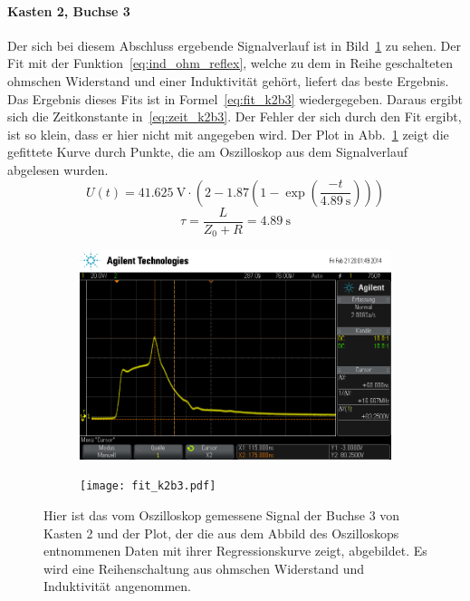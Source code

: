 \paragraph{Kasten 2, Buchse 3}
Der sich bei diesem Abschluss ergebende Signalverlauf ist in
Bild~\ref{fig:k2b3} zu sehen. Der Fit mit der
Funktion~\eqref{eq:ind_ohm_reflex}, welche zu dem in Reihe geschalteten
ohmschen Widerstand und einer Induktivität gehört, liefert das beste
Ergebnis. Das Ergebnis dieses Fits ist in Formel~\eqref{eq:fit_k2b3}
wiedergegeben.  Daraus ergibt sich die Zeitkonstante
in~\eqref{eq:zeit_k2b3}.  Der Fehler der sich durch den Fit ergibt, ist
so klein, dass er hier nicht mit angegeben wird.  Der Plot in
Abb.~\ref{fig:k2b3} zeigt die gefittete Kurve durch Punkte, die am
Oszilloskop aus dem Signalverlauf abgelesen wurden.
%
\begin{equation}
  U(t) = \SI{41.625}{\volt}\cdot\left(2 - 
    1.87\left(1-\exp{\left(\frac{-t}{\SI{4.89}{\second}}\right)}
    \right)\right)
  \label{eq:fit_k2b3}
\end{equation}
%
\begin{equation}
  \tau = \frac{L}{Z_0 + R} = \SI{4.89}{\second}
  \label{eq:zeit_k2b3}
\end{equation}
%
\begin{figure}[]
  \centering
  \begin{subfigure}{0.45\textwidth}
    \includegraphics[width=\textwidth]{k2b3.png}
  \end{subfigure}
  \quad
  \begin{subfigure}{0.45\textwidth}
    \texttt{[image: fit\_k2b3.pdf]}
  \end{subfigure}

  \caption{Hier ist das vom Oszilloskop gemessene Signal der Buchse 3
    von Kasten 2 und der Plot, der die aus dem Abbild des Oszilloskops
    entnommenen Daten mit ihrer Regressionskurve zeigt, abgebildet.  Es
    wird eine Reihenschaltung aus ohmschen Widerstand und Induktivität
    angenommen.}
  \label{fig:k2b3}
\end{figure}

